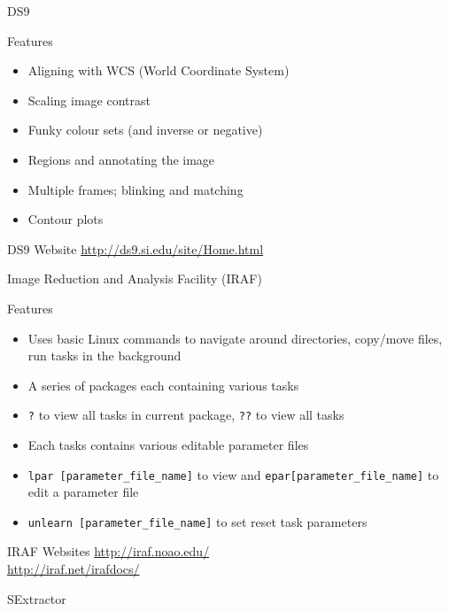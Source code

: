 \documentclass{beamer}
\begin{document}
\begin{frame}{DS9}
  \begin{block}{Features}
   \begin{itemize}
    \item{Aligning with WCS (World Coordinate System)}
    \item{Scaling image contrast}
    \item{Funky colour sets (and inverse or negative)}
    \item{Regions and annotating the image}
    \item{Multiple frames; blinking and matching}    
    \item{Contour plots}
  \end{itemize}
  \end{block}
  \begin{block}{DS9 Website}
    \url{http://ds9.si.edu/site/Home.html}
  \end{block}
\end{frame}

\begin{frame}{Image Reduction and Analysis Facility (IRAF)}
  \begin{block}{Features}
   \begin{itemize}
    \item{Uses basic Linux commands to navigate around directories, copy/move files, run tasks in the background}
    \item{A series of packages each containing various tasks}
    \item{\texttt{?} to view all tasks in current package, \texttt{??} to view all tasks}
    \item{Each tasks contains various editable parameter files}
    \item{\texttt{lpar [parameter\_file\_name]} to view and \texttt{epar[parameter\_file\_name]} to edit a  parameter file}    
    \item{\texttt{unlearn [parameter\_file\_name]} to set reset task parameters}
   \end{itemize}
  \end{block}
  \begin{block}{IRAF Websites}
    \url{http://iraf.noao.edu/}\\
    \url{http://iraf.net/irafdocs/}
  \end{block}
\end{frame}

\begin{frame}{SExtractor}

\end{frame}
\end{document}

